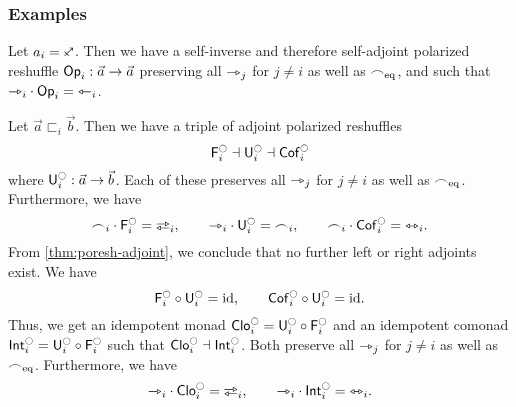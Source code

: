 \documentclass[a4paper]{memoir}
\begin{document}
\subsubsection{Examples}
\begin{example} \label{ex:poresh-op}
	Let $a_i = \ypolar$.
	Then we have a self-inverse and therefore self-adjoint polarized reshuffle ${\mathsf{Op}}_i : \vec a \to \vec a$ preserving all ${\rightarrowtriangle}_j$ for $j \neq i$ as well as ${\frown}_{{\mathrm{eq}}}$, and such that ${\rightarrowtriangle}_i \cdot {\mathsf{Op}}_i = {\leftarrowtriangle}_i$.
\end{example}
\begin{example} \label{ex:poresh-sym}
	Let $\vec a \sqsubset_i \vec b$.
	Then we have a triple of adjoint polarized reshuffles
	\[
		\Fsymresh_i \dashv \Usymresh_i \dashv \Csymresh_i
	\]
	where $\Usymresh_i : \vec a \to \vec b$.
	Each of these preserves all ${\rightarrowtriangle}_j$ for $j \neq i$ as well as ${\frown}_{{\mathrm{eq}}}$. Furthermore, we have
	\[
		\edgesym_i \cdot \Fsymresh_i = \infrajetsym_i, \qquad
		\jetsym_i \cdot \Usymresh_i = \edgesym_i, \qquad
		\edgesym_i \cdot \Csymresh_i = \equijetsym_i.
	\]
	From \cref{thm:poresh-adjoint}, we conclude that no further left or right adjoints exist. We have
	\[
		\Fsymresh_i \circ \Usymresh_i = \id, \qquad \Csymresh_i \circ \Usymresh_i = \id.
	\]
	Thus, we get an idempotent monad $\UFsymresh_i = \Usymresh_i \circ \Fsymresh_i$ and an idempotent comonad $\UCsymresh_i = \Usymresh_i \circ \Fsymresh_i$ such that $\UFsymresh_i \dashv \UCsymresh_i$.
	Both preserve all ${\rightarrowtriangle}_j$ for $j \neq i$ as well as ${\frown}_{{\mathrm{eq}}}$. Furthermore, we have
	\[
		\jetsym_i \cdot \UFsymresh_i = \infrajetsym_i, \qquad
		\jetsym_i \cdot \UCsymresh_i = \equijetsym_i.
	\]
\end{example}
\end{document}
